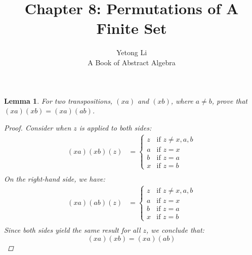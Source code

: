 \documentclass[12pt]{article}
\newtheorem{lemma}{Lemma}
\begin{document}

\title{Chapter 8: Permutations of A Finite Set}
\author{Yetong Li \\ A Book of Abstract Algebra}

\maketitle


\begin{lemma}
  For two transpositions, $(xa)$ and $(xb)$, where $a \neq b$,
  prove that $(xa)(xb) = (xa)(ab)$.
  \begin{proof}
    Consider when $z$ is applied to both sides:
    \begin{align*}
      (xa)(xb)(z) & = \begin{cases}
                        z & \text{if } z \neq x, a, b \\
                        a & \text{if } z = x          \\
                        b & \text{if } z = a          \\
                        x & \text{if } z = b
                      \end{cases} \\
    \end{align*}
    On the right-hand side, we have:
    \begin{align*}
      (xa)(ab)(z) & = \begin{cases}
                        z & \text{if } z \neq x, a, b \\
                        a & \text{if } z = x          \\
                        b & \text{if } z = a          \\
                        x & \text{if } z = b
                      \end{cases} \\
    \end{align*}
    Since both sides yield the same result for all $z$, we conclude that:
    \[
      (xa)(xb) = (xa)(ab)
    \]
  \end{proof}
\end{lemma}
\end{document}
